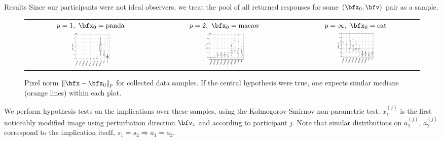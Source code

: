 \documentclass[final,notheorems]{beamer}
\newlength{\colwidth}
\begin{document}
\begin{frame}[t]
\begin{columns}[t]
\begin{column}{\colwidth}
  \begin{block}{Results}
    Since our participants were not ideal observers, we treat the pool of all returned responses for some $(\bfx_0, \bfv)$ pair as a sample.
    \begin{figure}
      \begin{center}
        \begin{tabular}{ccc}
          $p=1,\ \bfx_0=\text{panda}$ & $p=2,\ \bfx_0=\text{macaw}$ & $p=\infty,\ \bfx_0=\text{cat}$ \\
          \includegraphics[width=0.3\textwidth]{fig/pixel_1_norm_boxplot_panda.eps} &
          \includegraphics[width=0.3\textwidth]{fig/pixel_2_norm_boxplot_macaw.eps} &
          \includegraphics[width=0.3\textwidth]{fig/pixel_inf_norm_boxplot_cat.eps}
        \end{tabular}
      \end{center}
      \caption{Pixel norm $\|\bfx-\bfx_0\|_p$ for collected data samples. If the central hypothesis were true, one expects similar medians (orange lines) within each plot.}
      \label{fig:Lp_excerpt}
    \end{figure}

    We perform hypothesis tests on the implications over these samples, using the Kolmogorov-Smirnov non-parametric test. $x_1^{(j)}$ is the first noticeably modified image using perturbation direction $\bfv_1$ and according to participant $j$. Note that similar distributions on $a_1^{(j)}$, $a_2^{(j)}$ correspond to the implication itself, $s_1=s_2\Rightarrow a_1=a_2$.


\end{block}
\end{column}
\end{columns}
\end{frame}
\end{document}
